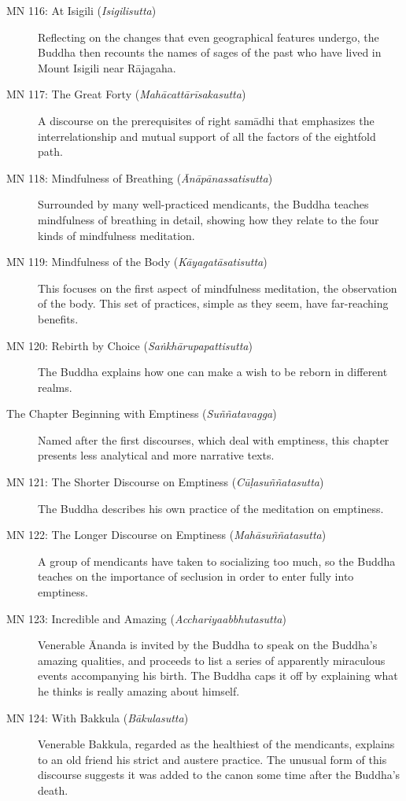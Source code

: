 \documentclass[12pt,openany]{book}%
\begin{document}
\begin{description}
\item[MN 116: At Isigili (\textit{\textsanskrit{Isigilisutta}})] Reflecting on the changes that even geographical features undergo, the Buddha then recounts the names of sages of the past who have lived in Mount Isigili near \textsanskrit{Rājagaha}.%
\item[MN 117: The Great Forty (\textit{\textsanskrit{Mahācattārīsakasutta}})] A discourse on the prerequisites of right \textsanskrit{samādhi} that emphasizes the interrelationship and mutual support of all the factors of the eightfold path.%
\item[MN 118: Mindfulness of Breathing (\textit{\textsanskrit{Ānāpānassatisutta}})] Surrounded by many well-practiced mendicants, the Buddha teaches mindfulness of breathing in detail, showing how they relate to the four kinds of mindfulness meditation.%
\item[MN 119: Mindfulness of the Body (\textit{\textsanskrit{Kāyagatāsatisutta}})] This focuses on the first aspect of mindfulness meditation, the observation of the body. This set of practices, simple as they seem, have far-reaching benefits.%
\item[MN 120: Rebirth by Choice (\textit{\textsanskrit{Saṅkhārupapattisutta}})] The Buddha explains how one can make a wish to be reborn in different realms.%
\item[The Chapter Beginning with Emptiness (\textit{\textsanskrit{Suññatavagga}})] Named after the first discourses, which deal with emptiness, this chapter presents less analytical and more narrative texts.%
\item[MN 121: The Shorter Discourse on Emptiness (\textit{\textsanskrit{Cūḷasuññatasutta}})] The Buddha describes his own practice of the meditation on emptiness.%
\item[MN 122: The Longer Discourse on Emptiness (\textit{\textsanskrit{Mahāsuññatasutta}})] A group of mendicants have taken to socializing too much, so the Buddha teaches on the importance of seclusion in order to enter fully into emptiness.%
\item[MN 123: Incredible and Amazing (\textit{\textsanskrit{Acchariyaabbhutasutta}})] Venerable Ānanda is invited by the Buddha to speak on the Buddha’s amazing qualities, and proceeds to list a series of apparently miraculous events accompanying his birth. The Buddha caps it off by explaining what he thinks is really amazing about himself.%
\item[MN 124: With Bakkula (\textit{\textsanskrit{Bākulasutta}})] Venerable Bakkula, regarded as the healthiest of the mendicants, explains to an old friend his strict and austere practice. The unusual form of this discourse suggests it was added to the canon some time after the Buddha’s death.%

\end{description}
\end{document}
